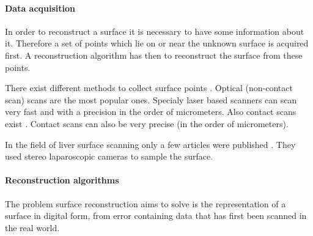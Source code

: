 \paragraph{Data acquisition}
In order to reconstruct a surface it is necessary to have some information about
it. Therefore a set of points which lie on or near the unknown surface is acquired first. A
reconstruction algorithm has then to reconstruct the surface from these points.

There exist different methods to collect surface points
\cite{franca20053d}\cite{levoy2000digital}\cite{cui20113d}\cite{chu2002infrared}\cite{dou20153d}.
Optical (non-contact scan) scans are the most popular ones. Specialy laser based
scanners can scan very fast and with a precision in the order of micrometers. Also contact scans exist
\cite{pai2001scanning}. Contact scans can also be very precise (in the order of
micrometers).

In the field of liver surface scanning only a few articles were published  \cite{maier2014comparative} \cite{thompson2015accuracy}. 
They used stereo laparoscopic cameras to sample the surface.

\paragraph{Reconstruction algorithms}

The problem
surface reconstruction aims to solve is the representation of a surface in 
digital form, from error containing data that has first been scanned in the
real world.

